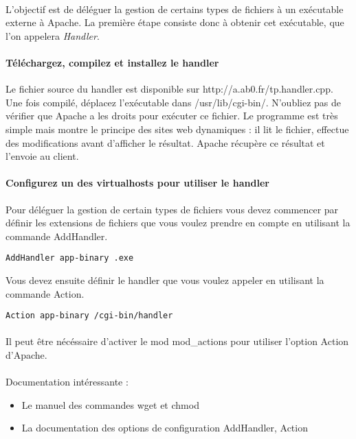 \documentclass[12pt,a4paper]{article}
\begin{document}
\paragraph{}
L'objectif est de déléguer la gestion de certains types de fichiers à un exécutable externe à Apache. La première étape consiste donc à obtenir cet exécutable, que l'on appelera \textit{Handler}. 

\paragraph{Téléchargez, compilez et installez le handler\\}
Le fichier source du handler est disponible sur http://a.ab0.fr/tp.handler.cpp. Une fois compilé, déplacez l'exécutable dans /usr/lib/cgi-bin/. N'oubliez pas de vérifier que Apache a les droits pour exécuter ce fichier. Le programme est très simple mais montre le principe des sites web dynamiques : il lit le fichier, effectue des modifications avant d'afficher le résultat. Apache récupère ce résultat et l'envoie au client.

\paragraph{Configurez un des virtualhosts pour utiliser le handler}
Pour déléguer la gestion de certain types de fichiers vous devez commencer par définir les extensions de fichiers que vous voulez prendre en compte en utilisant la commande AddHandler.

\begin{lstlisting}
AddHandler app-binary .exe
\end{lstlisting}

Vous devez ensuite définir le handler que vous voulez appeler en utilisant la commande Action.

\begin{lstlisting}
Action app-binary /cgi-bin/handler
\end{lstlisting}

\paragraph{}
Il peut être nécéssaire d'activer le mod mod\_actions pour utiliser l'option Action d'Apache.

\paragraph{}
Documentation intéressante : 
\begin{itemize}
\item Le manuel des commandes wget et chmod
\item La documentation des options de configuration AddHandler, Action
\end{itemize}
\end{document}
